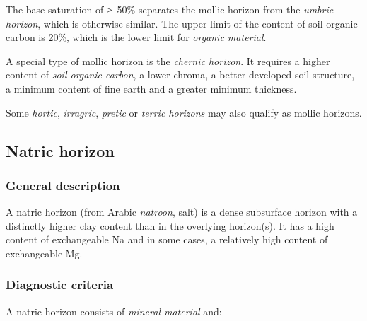 \documentclass[
  letterpaper,
  DIV=11,
  numbers=noendperiod]{scrreprt}
\begin{document}
The base saturation of ≥~50\% separates the mollic horizon from the
\emph{umbric horizon}, which is otherwise similar. The upper limit of
the content of soil organic carbon is 20\%, which is the lower limit for
\emph{organic material}.

A special type of mollic horizon is the \emph{chernic horizon}. It
requires a higher content of \emph{soil organic carbon}, a lower chroma,
a better developed soil structure, a minimum content of fine earth and a
greater minimum thickness.

Some \emph{hortic}, \emph{irragric}, \emph{pretic} or \emph{terric
horizons} may also qualify as mollic horizons.

\hypertarget{natric-horizon}{%
\subsection{Natric horizon}\label{natric-horizon}}

\hypertarget{general-description-20}{%
\subsubsection{General description}\label{general-description-20}}

A natric horizon (from Arabic \emph{natroon}, salt) is a dense
subsurface horizon with a distinctly higher clay content than in the
overlying horizon(s). It has a high content of exchangeable Na and in
some cases, a relatively high content of exchangeable Mg.

\hypertarget{diagnostic-criteria-20}{%
\subsubsection{Diagnostic criteria}\label{diagnostic-criteria-20}}

A natric horizon consists of \emph{mineral material} and:
\end{document}
